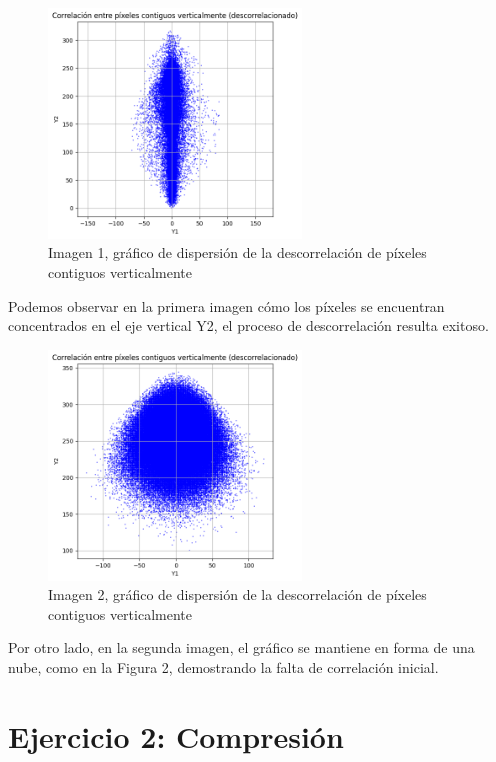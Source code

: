 \documentclass[a4paper,12pt]{article}
\begin{document}
\begin{figure}[H]
    \centering
    \includegraphics[width=0.6\textwidth]{Ejercicio1c.png}
    \caption{Imagen 1, gráfico de dispersión de la descorrelación de píxeles contiguos verticalmente}
    \label{fig:descorrelacion1}
\end{figure}
\vspace{-1em}
Podemos observar en la primera imagen cómo los píxeles se encuentran concentrados en el eje vertical Y2, el proceso de descorrelación resulta exitoso.
\vspace{-1em}
\begin{figure}[H]
    \centering
    \includegraphics[width=0.6\textwidth]{Ejercicio1d.png}
    \caption{Imagen 2, gráfico de dispersión de la descorrelación de píxeles contiguos verticalmente}
    \label{fig:descorrelacion2}
\end{figure}

Por otro lado, en la segunda imagen, el gráfico se mantiene en forma de una nube, como en la Figura 2, demostrando la falta de correlación inicial.
\newpage
\section*{Ejercicio 2: Compresión}
\end{document}
